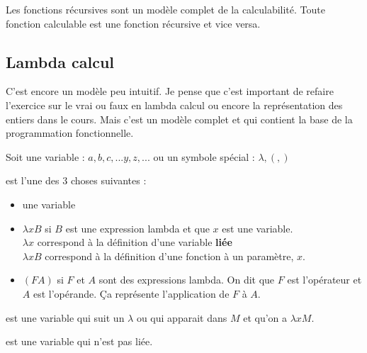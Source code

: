 \begin{myprop}
	Les fonctions récursives sont un modèle complet de la calculabilité. 
	Toute fonction calculable est une fonction récursive et vice versa.
\end{myprop}

\subsection{Lambda calcul}
\label{sub:lambda_calcul}
\begin{myrem}
	C'est encore un modèle peu intuitif. Je pense que c'est important 
	de refaire l'exercice sur le vrai ou faux en lambda calcul ou encore la 
	représentation des entiers dans le cours. Mais c'est un modèle complet 
	et qui contient la base de la programmation fonctionnelle.
\end{myrem}

\begin{mydef} Soit une variable : $a,b,c,...y,z,...$ ou un 
	symbole spécial : $\lambda, (, )$
\end{mydef}

\begin{mydef} est l'une des 3 choses suivantes :
	\begin{itemize}
		\item une variable
		\item $\lambda xB$ si $B$ est une expression lambda et que $x$ est 
			une variable. \\
			$\lambda x$ correspond à la définition 
			d'une variable \textbf{liée} \\
			$\lambda xB$ correspond à la définition d'une fonction 
			à un paramètre, $x$.
		\item $(FA)$ si $F$ et $A$ sont des expressions lambda. On dit que $F$ 
			est l'opérateur et $A$ est l'opérande. Ça représente 
			l'application de $F$ à $A$.
	\end{itemize}
\end{mydef}

\begin{mydef} est une variable qui suit un $\lambda$ ou qui 
	apparait dans $M$ et qu'on a $\lambda xM$. 
\end{mydef}

\begin{mydef} est une variable qui n'est pas liée.
\end{mydef}

